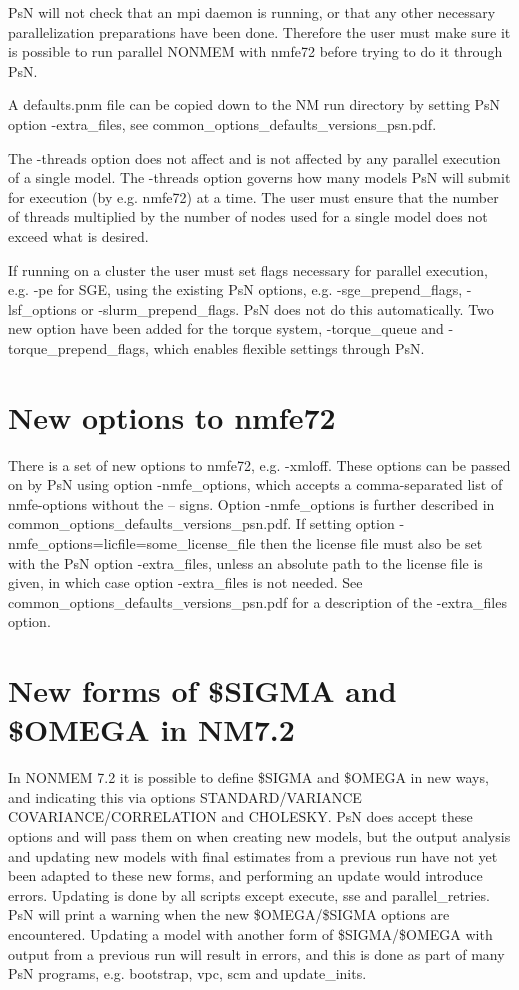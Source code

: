PsN will not check that an mpi daemon is running, or that any other necessary parallelization preparations have been done. Therefore the user must make sure it is possible to run parallel NONMEM with nmfe72 before trying to do it through PsN.

A defaults.pnm file can be copied down to the NM run directory by setting PsN option -extra\_files, see common\_options\_defaults\_versions\_psn.pdf.

The -threads option does not affect and is not affected by any parallel execution of a single model. The -threads option governs how many models PsN will submit for execution (by e.g. nmfe72) at a time. The user must ensure that the number of threads multiplied by the number of nodes used for a single model does not exceed what is desired. 

If running on a cluster the user must set flags necessary for parallel execution, e.g. -pe for SGE, using the existing PsN options, e.g. -sge\_prepend\_flags, -lsf\_options or -slurm\_prepend\_flags. PsN does not do this automatically. Two new option have been added for the torque system, -torque\_queue and -torque\_prepend\_flags, which enables flexible settings through PsN.


\section{New options to nmfe72}
There is a set of new options to nmfe72, e.g. -xmloff. These options can be passed on by PsN using option -nmfe\_options, which accepts a comma-separated list of nmfe-options without the – signs. Option -nmfe\_options is further described in common\_options\_defaults\_versions\_psn.pdf. If setting option -nmfe\_options=licfile=some\_license\_file then the license file must also be set with the PsN option -extra\_files, unless an absolute path to the license file is given, in which case option -extra\_files is not needed. See common\_options\_defaults\_versions\_psn.pdf for a description of the -extra\_files option.

\section{New forms of \$SIGMA and \$OMEGA in NM7.2}
In NONMEM 7.2 it is possible to define \$SIGMA and \$OMEGA in new ways, and indicating this via options STANDARD/VARIANCE COVARIANCE/CORRELATION and CHOLESKY. PsN does accept these options and will pass them on when creating new models, but the output analysis and updating new models with final estimates from a previous run have not yet been adapted to these new forms, and performing an update would introduce errors. Updating is done by all scripts except execute, sse and parallel\_retries. PsN will print a warning when the new \$OMEGA/\$SIGMA options are encountered. Updating a model with another form of \$SIGMA/\$OMEGA with output from a previous run will result in errors, and this is done as part of many PsN programs, e.g. bootstrap, vpc, scm and update\_inits. 

